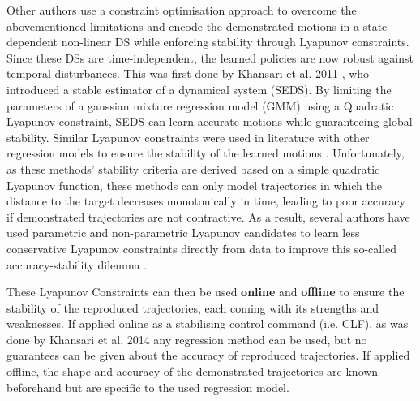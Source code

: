 Other authors use a constraint optimisation approach to overcome the abovementioned limitations and encode the demonstrated motions in a state-dependent non-linear DS while enforcing stability through Lyapunov constraints. Since these DSs are time-independent, the learned policies are now robust against temporal disturbances. This was first done by Khansari et al. 2011 \cite{khansari-zadehLearningStableNonlinear2011}, who introduced a stable estimator of a dynamical system (SEDS). By limiting the parameters of a gaussian mixture regression model (GMM) using a Quadratic Lyapunov constraint, SEDS can learn accurate motions while guaranteeing global stability. Similar Lyapunov constraints were used in literature with other regression models to ensure the stability of the learned motions \cite{lemmeNeurallyImprintedStable2013,huNeuralLearningStable2015,umlauftLearningStableStochastic2017,umlauftLearningStableGaussian2017,medinaLearningStableTask2017,duanFastStableLearning2019,xuRobotTrajectoryTracking2019,umlauftLearningStochasticallyStable2020,xuLearningBasedKinematicControl2022,salehiLearningDiscreteTimeUncertain2022,davoodiRuleBasedSafeProbabilistic2022}. Unfortunately, as these methods' stability criteria are derived based on a simple quadratic Lyapunov function, these methods can only model trajectories in which the distance to the target decreases monotonically in time, leading to poor accuracy if demonstrated trajectories are not contractive. As a result, several authors have used parametric and non-parametric Lyapunov candidates to learn less conservative Lyapunov constraints directly from data to improve this so-called accuracy-stability dilemma \cite{khansari-zadehLearningControlLyapunov2014,neumannNeuralLearningStable2013,lemmeNeuralLearningVector2014,umlauftUncertaintybasedControlLyapunov2018,duttaLearningStableMovement2018,duttaSkillLearningHuman2021,umlauftUncertaintybasedHumanMotion2019,ravanbakhshFormalPolicyLearning2019,umlauftLearningStochasticallyStable2020,xiaoLearningStableNonparametric2020,tesfazgiInverseReinforcementLearning2021,coulombeGeneratingStableCollisionFree2022}. 


These Lyapunov Constraints can then be used \textbf{online} and \textbf{offline} to ensure the stability of the reproduced trajectories, each coming with its strengths and weaknesses. If applied online as a stabilising control command (i.e. CLF), as was done by Khansari et al. 2014 \cite{khansari-zadehLearningControlLyapunov2014} any regression method can be used, but no guarantees can be given about the accuracy of reproduced trajectories. If applied offline, the shape and accuracy of the demonstrated trajectories are known beforehand but are specific to the used regression model.

